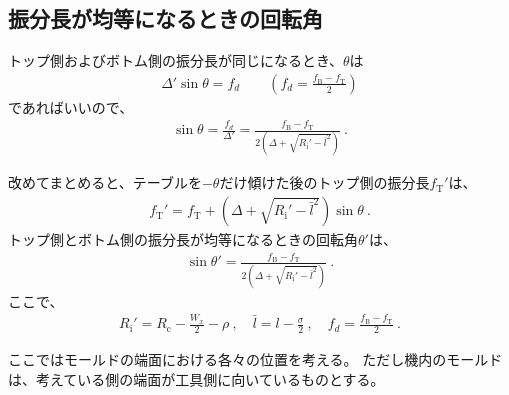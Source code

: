 \subsection{振分長が均等になるときの回転角}
トップ側およびボトム側の振分長が同じになるとき、$\theta$は
\begin{align*}
  \varDelta'\sin\theta = f_d \qquad \left(f_d = \frac{f_\mathrm B-f_\mathrm T}2\right)
\end{align*}
であればいいので、
\begin{align}
  \label{eq:saifuriwakeangle}
  \sin\theta = \frac{f_d}{\varDelta'}
  = \frac{f_\mathrm B-f_\mathrm T}{2\left(\varDelta+\sqrt{R_\mathrm i'-\bar l^2}\right)}~.
\end{align}
\begin{hosoku}
改めてまとめると、テーブルを$-\theta$だけ傾けた後のトップ側の振分長$f_\mathrm T'$は、
\begin{align*}
  f_\mathrm T' = f_\mathrm T+\left(\varDelta+\sqrt{R_\mathrm i'-\bar l^2}\right)\!\sin\theta\ .
\end{align*}
トップ側とボトム側の振分長が均等になるときの回転角$\theta'$は、
\begin{align*}
  \sin\theta' = \frac{f_\mathrm B-f_\mathrm T}{2\left(\varDelta+\sqrt{R_\mathrm i'-\bar l^2}\right)}\ .
\end{align*}
ここで、
\begin{align*}
  R_\mathrm i' = R_\mathrm c-\frac{W_x}2-\rho\ ,\quad
  \bar l = l-\frac\sigma2\ ,\quad
  f_d = \frac{f_\mathrm B-f_\mathrm T}2\ .
\end{align*}
\end{hosoku}




ここではモールドの端面における各々の位置を考える。
ただし機内のモールドは、考えている側の端面が工具側に向いているものとする。




